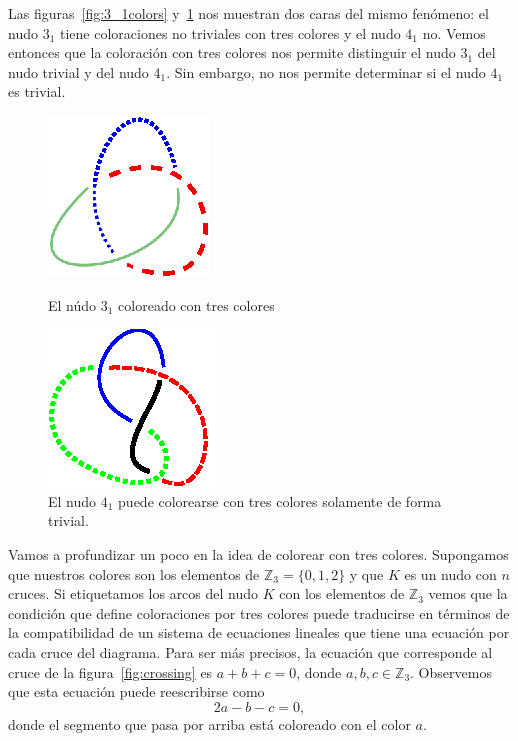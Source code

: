 \documentclass[graybox]{svmult}
\newcommand{\Z}{\mathbb{Z}}
\begin{document}
\begin{example}
    \label{exa:3colors}
    Las figuras~\ref{fig:3_1colors} 
	y~\ref{fig:4_1colors} nos muestran dos caras del mismo fenómeno: el nudo
	$3_1$ tiene coloraciones no triviales con tres colores y el nudo $4_1$ no.
	Vemos entonces que la coloración con tres colores nos permite distinguir el
	nudo $3_1$ del nudo trivial y del nudo $4_1$. Sin embargo, no nos permite
	determinar si el nudo $4_1$ es trivial. 
	\begin{figure}[ht]
		\begin{minipage}{0.45\textwidth}
			\centering
			\includegraphics[scale=0.7]{images/3_1colors}
			\caption{El núdo $3_1$ coloreado con tres colores}
			\label{fig:3_1colors}
		\end{minipage}
		\begin{minipage}{0.45\textwidth}
			\centering
			\includegraphics[scale=0.7]{images/4_1colors}
			\caption{El nudo $4_1$ puede colorearse con tres colores solamente de forma trivial.}
			\label{fig:4_1colors}
		\end{minipage}
	\end{figure}
\end{example}

Vamos a profundizar un poco en la idea de colorear con tres colores.
Supongamos que nuestros colores son los elementos de $\Z_3=\{0,1,2\}$ y que
$K$ es un nudo con $n$ cruces. Si etiquetamos los arcos del nudo $K$ con
los elementos de $\Z_3$ vemos que la condición que define coloraciones por
tres colores puede traducirse en términos de la compatibilidad de un
sistema de ecuaciones lineales que tiene una ecuación por cada cruce del
diagrama.  Para ser más precisos, la ecuación que corresponde al cruce de
la figura~\ref{fig:crossing} es $a+b+c=0$, donde $a,b,c\in\Z_3$.
Observemos que esta ecuación puede reescribirse como 
\begin{equation} 
	\label{eq:3colors}
	2a-b-c=0,
\end{equation}
donde el segmento que pasa por arriba está coloreado con el color $a$. 
\end{document}
